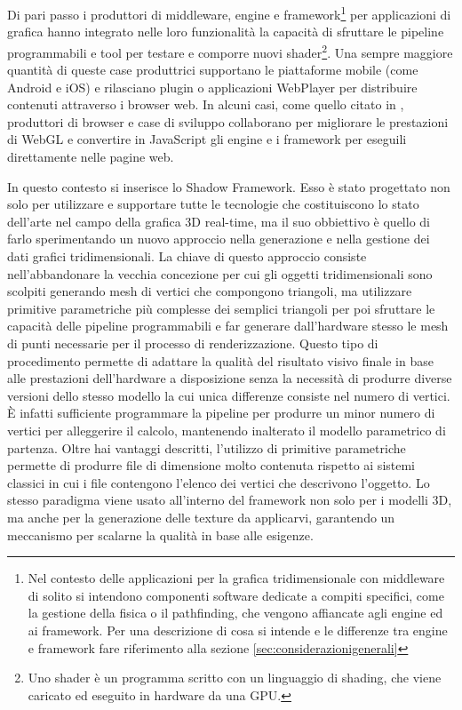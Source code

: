 Di pari passo i produttori di middleware, engine e framework\footnote{Nel contesto delle applicazioni per la grafica tridimensionale con middleware di solito si intendono componenti software dedicate a compiti specifici, come la gestione della fisica o il pathfinding, che vengono affiancate agli engine ed ai framework. Per una descrizione di cosa si intende e le differenze tra engine e framework fare riferimento alla sezione \ref{sec:considerazionigenerali}} per applicazioni di grafica hanno integrato nelle loro funzionalit\`a la capacit\`a di sfruttare le pipeline programmabili e tool per testare e comporre nuovi shader\footnote{Uno shader \`e un programma scritto con un linguaggio di shading, che viene caricato ed eseguito in hardware da una \ac{GPU}.}. Una sempre maggiore quantit\`a di queste case produttrici supportano le piattaforme mobile (come Android e iOS) e rilasciano plugin o applicazioni WebPlayer per distribuire contenuti attraverso i browser web. 
In alcuni casi, come quello citato in \cite{site:mozillaunrealannounce}, produttori di browser e case di sviluppo collaborano per migliorare le prestazioni di WebGL e convertire in JavaScript gli engine e i framework per eseguili direttamente nelle pagine web.

In questo contesto si inserisce lo Shadow Framework. Esso \`e stato progettato non solo per utilizzare e supportare tutte le tecnologie che costituiscono lo stato dell'arte nel campo della grafica 3D real-time, ma il suo obbiettivo \`e quello di farlo sperimentando un nuovo approccio nella generazione e nella gestione dei dati grafici tridimensionali. La chiave di questo approccio consiste nell'abbandonare la vecchia concezione per cui gli oggetti tridimensionali sono scolpiti generando mesh di vertici che compongono triangoli, ma utilizzare primitive parametriche pi\`u complesse dei semplici triangoli per poi sfruttare le capacit\`a delle pipeline programmabili e far generare dall'hardware stesso le mesh di punti necessarie per il processo di renderizzazione.
Questo tipo di procedimento permette di adattare la qualit\`a  del risultato visivo finale in base alle prestazioni dell'hardware a disposizione senza la necessit\`a di produrre diverse versioni dello stesso modello la cui unica differenze consiste nel numero di vertici. \`E infatti sufficiente programmare la pipeline per produrre un minor numero di vertici per alleggerire il calcolo, mantenendo inalterato il modello parametrico di partenza. Oltre hai vantaggi descritti, l'utilizzo di primitive parametriche permette di produrre file di dimensione molto contenuta rispetto ai sistemi classici in cui i file contengono l'elenco dei vertici che descrivono l'oggetto. Lo stesso paradigma viene usato all'interno del framework non solo per i modelli 3D, ma anche per la generazione delle texture da applicarvi, garantendo un meccanismo per scalarne la qualit\`a in base alle esigenze.

